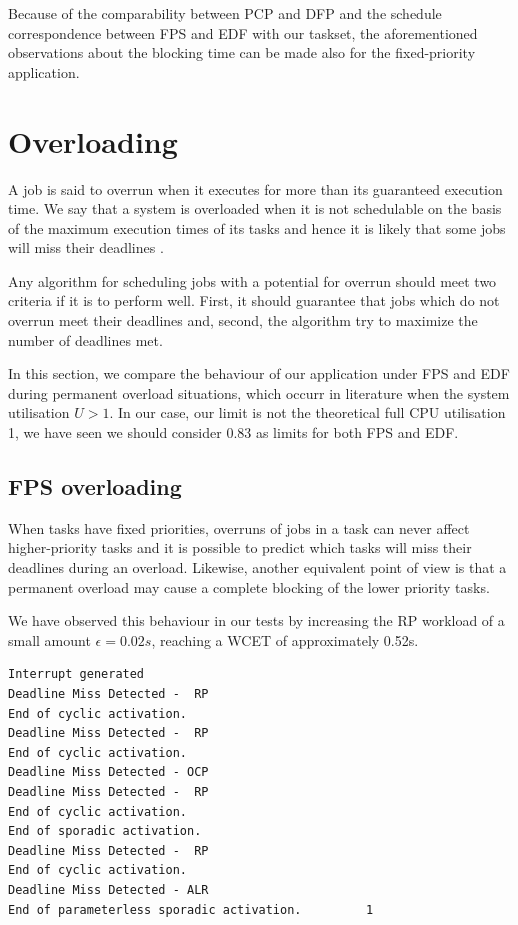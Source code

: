 \documentclass{article}
\begin{document}
Because of the comparability between PCP and DFP and the schedule correspondence between FPS and EDF with our taskset, the aforementioned observations about the blocking time can be made also for the fixed-priority application.

\section{Overloading}

A job is said to overrun when it executes for more than its guaranteed execution time. We say that a system is overloaded when it is not schedulable on the basis of the maximum execution times of its tasks and hence it is likely that some jobs will miss their deadlines \cite{liu-overload}.

Any algorithm for scheduling jobs with a potential for overrun should meet two criteria if it is to perform well. First, it should guarantee that jobs which do not overrun meet their deadlines and, second, the algorithm try to maximize the number of deadlines met.

In this section, we compare the behaviour of our application under FPS and EDF during permanent overload situations, which occurr in literature when the system utilisation $U > 1$. In our case, our limit is not the theoretical full CPU utilisation 1, we have seen we should consider 0.83 as limits for both FPS and EDF.

\subsection{FPS overloading}

When tasks have fixed priorities, overruns of jobs in a task can never affect higher-priority tasks and it is possible to predict which tasks will miss their deadlines during an overload. Likewise, another equivalent point of view is that a permanent overload may cause a complete blocking of the lower priority tasks.

We have observed this behaviour in our tests by increasing the RP workload of a small amount $\epsilon = 0.02s$, reaching a WCET of approximately 0.52s.

\begin{lstlisting}
Interrupt generated
Deadline Miss Detected -  RP
End of cyclic activation.
Deadline Miss Detected -  RP
End of cyclic activation.
Deadline Miss Detected - OCP
Deadline Miss Detected -  RP
End of cyclic activation.
End of sporadic activation.
Deadline Miss Detected -  RP
End of cyclic activation.
Deadline Miss Detected - ALR
End of parameterless sporadic activation.         1
\end{lstlisting}
\end{document}
